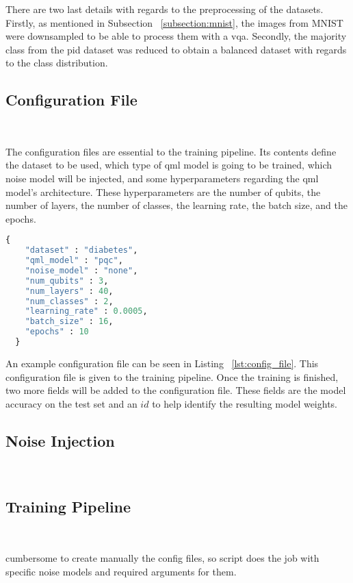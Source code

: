 There are two last details with regards to the preprocessing
of the datasets. Firstly, as mentioned in Subsection
~\ref{subsection:mnist}, the images from MNIST were downsampled
to be able to process them with a \ac{vqa}. Secondly, the majority
class from the \ac{pid} dataset was reduced to obtain a balanced
dataset with regards to the class distribution. \

\subsection{Configuration File}\label{subsection:config} \

The configuration files are essential to the training
pipeline. Its contents define the dataset to be used,
which type of \ac{qml} model is going to be trained,
which noise model will be injected, and some hyperparameters
regarding the \ac{qml} model's architecture. These hyperparameters
are the number of qubits, the number of layers, the number of
classes, the learning rate, the batch size, and the epochs. \

\begin{lstlisting}[language=Python, caption={Example configuration file.}, label=lst:config_file]
  {
    "dataset" : "diabetes",
    "qml_model" : "pqc",
    "noise_model" : "none",
    "num_qubits" : 3,
    "num_layers" : 40,
    "num_classes" : 2,
    "learning_rate" : 0.0005,
    "batch_size" : 16,
    "epochs" : 10
  }
\end{lstlisting}

An example configuration file can be seen in Listing
~\ref{lst:config_file}. This configuration file is given
to the training pipeline. Once the training is finished,
two more fields will be added to the configuration file.
These fields are the model accuracy on the test set and an
\(id\) to help identify the resulting model weights. \

\subsection{Noise Injection}\label{subsection:noise_injection} \

\subsection{Training Pipeline}\label{subsection:pipeline} \

cumbersome to create manually the config files, so script does the job
with specific noise models and required arguments for them.

